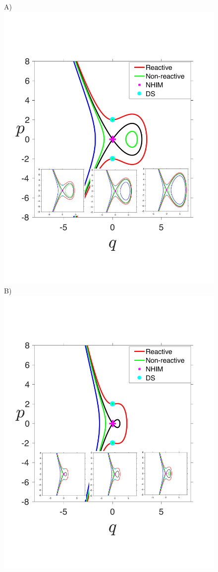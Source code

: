 \documentclass{ws-ijbc}
\begin{document}
\begin{itemize}
	\begin{figure}[htbp]
		\begin{center}
		A)\includegraphics[scale=0.33]{fig6a}
		B)\includegraphics[scale=0.33]{fig6b}

\end{center}
\end{figure}
\end{itemize}
\end{document}
